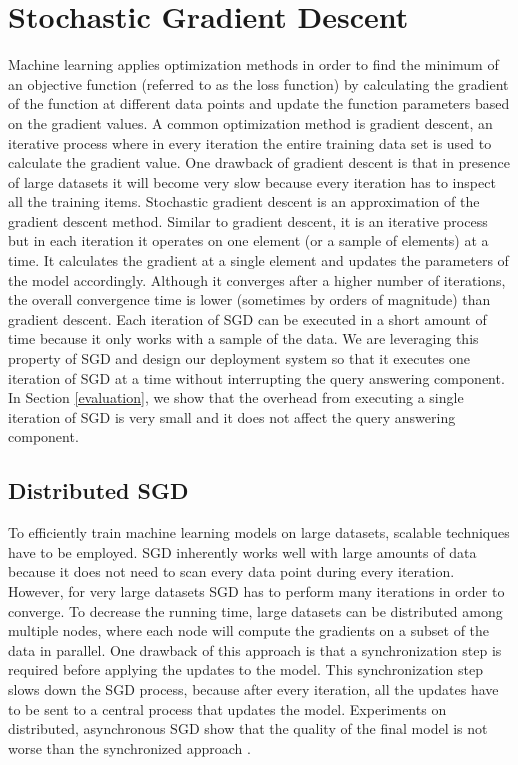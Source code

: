 \documentclass{vldb}
\begin{document}
\section{Stochastic Gradient Descent} \label{sgd}
Machine learning applies optimization methods in order to find the minimum of an objective function (referred to as the loss function) by calculating the gradient of the function at different data points and update the function parameters based on the gradient values.
A common optimization method is gradient descent, an iterative process where in every iteration the entire training data set is used to calculate the gradient value.
One drawback of gradient descent is that in presence of large datasets it will become very slow because every iteration has to inspect all the training items.
Stochastic gradient descent \cite{bottou2010large} is an approximation of the gradient descent method. 
Similar to gradient descent, it is an iterative process but in each iteration it operates on one element (or a sample of elements) at a time. 
It calculates the gradient at a single element and updates the parameters of the model accordingly. 
Although it converges after a higher number of iterations, the overall convergence time is lower (sometimes by orders of magnitude) than gradient descent. 
Each iteration of SGD can be executed in a short amount of time because it only works with a sample of the data.
We are leveraging this property of SGD and design our deployment system so that it executes one iteration of SGD at a time without interrupting the query answering component.
In Section \ref{evaluation}, we show that the overhead from executing a single iteration of SGD is very small and it does not affect the query answering component.

\subsection{Distributed SGD}
To efficiently train machine learning models on large datasets, scalable techniques have to be employed.
SGD inherently works well with large amounts of data because it does not need to scan every data point during every iteration.
However, for very large datasets SGD has to perform many iterations in order to converge.
To decrease the running time, large datasets can be distributed among multiple nodes, where each node will compute the gradients on a subset of the data in parallel.
One drawback of this approach is that a synchronization step is required before applying the updates to the model. 
This synchronization step slows down the SGD process, because after every iteration, all the updates have to be sent to a central process that updates the model.
Experiments on distributed, asynchronous SGD show that the quality of the final model is not worse than the synchronized approach \cite{recht2011hogwild, dean2012large}. 
\end{document}

